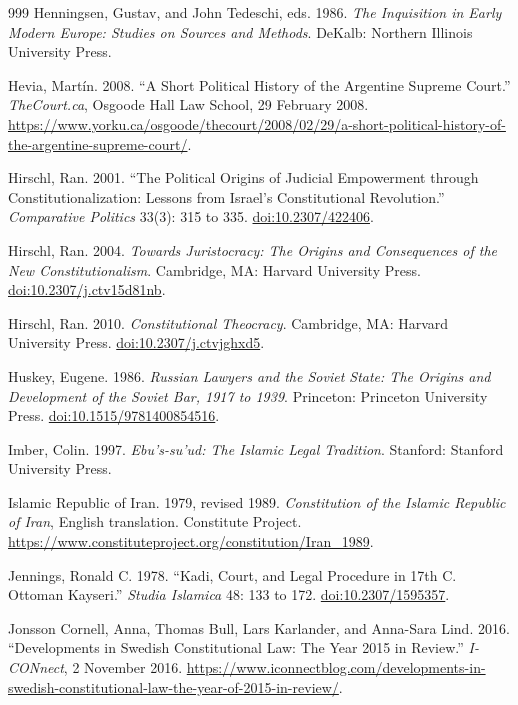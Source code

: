 \documentclass[11pt,letterpaper]{article}
\theoremstyle{definition}
\theoremstyle{remark}
\begin{document}
\begin{thebibliography}{999}
Henningsen, Gustav, and John Tedeschi, eds. 1986. \emph{The Inquisition in Early Modern Europe: Studies on Sources and Methods}. DeKalb: Northern Illinois University Press.

Hevia, Mart\'in. 2008. ``A Short Political History of the Argentine Supreme Court.'' \emph{TheCourt.ca}, Osgoode Hall Law School, 29 February 2008. \url{https://www.yorku.ca/osgoode/thecourt/2008/02/29/a-short-political-history-of-the-argentine-supreme-court/}.

Hirschl, Ran. 2001. ``The Political Origins of Judicial Empowerment through Constitutionalization: Lessons from Israel's Constitutional Revolution.'' \emph{Comparative Politics} 33(3): 315 to 335. \href{https://doi.org/10.2307/422406}{doi:10.2307/422406}.

Hirschl, Ran. 2004. \emph{Towards Juristocracy: The Origins and Consequences of the New Constitutionalism}. Cambridge, MA: Harvard University Press. \href{https://doi.org/10.2307/j.ctv15d81nb}{doi:10.2307/j.ctv15d81nb}.

Hirschl, Ran. 2010. \emph{Constitutional Theocracy}. Cambridge, MA: Harvard University Press. \href{https://doi.org/10.2307/j.ctvjghxd5}{doi:10.2307/j.ctvjghxd5}.

Huskey, Eugene. 1986. \emph{Russian Lawyers and the Soviet State: The Origins and Development of the Soviet Bar, 1917 to 1939}. Princeton: Princeton University Press. \href{https://doi.org/10.1515/9781400854516}{doi:10.1515/9781400854516}.

Imber, Colin. 1997. \emph{Ebu's-su'ud: The Islamic Legal Tradition}. Stanford: Stanford University Press.

Islamic Republic of Iran. 1979, revised 1989. \emph{Constitution of the Islamic Republic of Iran}, English translation. Constitute Project. \url{https://www.constituteproject.org/constitution/Iran_1989}.

Jennings, Ronald C. 1978. ``Kadi, Court, and Legal Procedure in 17th C. Ottoman Kayseri.'' \emph{Studia Islamica} 48: 133 to 172. \href{https://doi.org/10.2307/1595357}{doi:10.2307/1595357}.

Jonsson Cornell, Anna, Thomas Bull, Lars Karlander, and Anna-Sara Lind. 2016. ``Developments in Swedish Constitutional Law: The Year 2015 in Review.'' \emph{I-CONnect}, 2 November 2016. \url{https://www.iconnectblog.com/developments-in-swedish-constitutional-law-the-year-of-2015-in-review/}.


\end{thebibliography}
\end{document}
